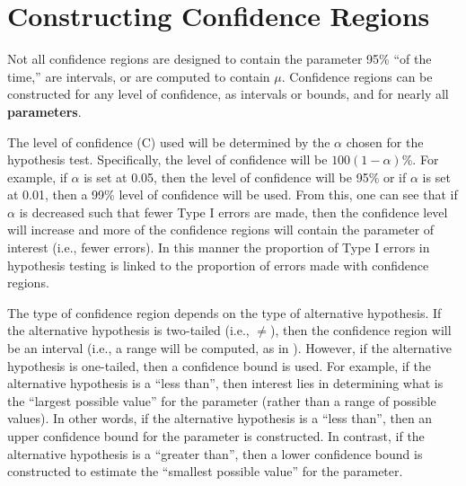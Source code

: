 \documentclass[10pt,openany]{book}\usepackage[]{graphicx}\usepackage[]{color}
\begin{document}
\section{Constructing Confidence Regions} \label{sec:CIConstruct}
\vspace{-12pt}
Not all confidence regions are designed to contain the parameter 95\% ``of the time,'' are intervals, or are computed to contain $\mu$.  Confidence regions can be constructed for any level of confidence, as intervals or bounds, and for nearly all \textbf{parameters}.

The level of confidence (C) used will be determined by the $\alpha$ chosen for the hypothesis test.  Specifically, the level of confidence will be $100(1-\alpha)$\%.  For example, if $\alpha$ is set at 0.05, then the level of confidence will be 95\% or if $\alpha$ is set at 0.01, then a 99\% level of confidence will be used.  From this, one can see that if $\alpha$ is decreased such that fewer Type I errors are made, then the confidence level will increase and more of the confidence regions will contain the parameter of interest (i.e., fewer errors).  In this manner the proportion of Type I errors in hypothesis testing is linked to the proportion of errors made with confidence regions.


The type of confidence region depends on the type of alternative hypothesis.  If the alternative hypothesis is two-tailed (i.e., $\neq$), then the confidence region will be an interval (i.e., a range will be computed, as in ). However, if the alternative hypothesis is one-tailed, then a confidence bound is used. For example, if the alternative hypothesis is a ``less than'', then interest lies in determining what is the ``largest possible value'' for the parameter (rather than a range of possible values).  In other words, if the alternative hypothesis is a ``less than'', then an upper confidence bound for the parameter is constructed.  In contrast, if the alternative hypothesis is a ``greater than'', then a lower confidence bound is constructed to estimate the ``smallest possible value'' for the parameter.


\vspace{-12pt}
\end{document}
